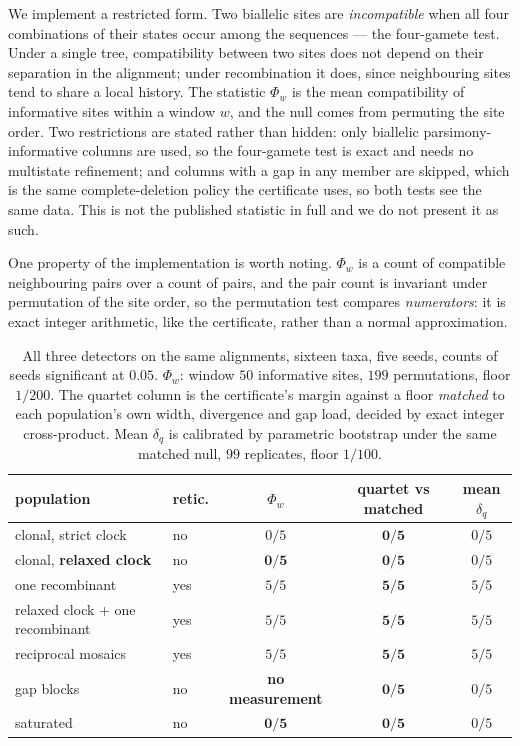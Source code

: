 \documentclass[11pt,a4paper]{article}
\theoremstyle{definition}
\theoremstyle{remark}
\begin{document}
We implement a restricted form. Two biallelic sites are \emph{incompatible} when
all four combinations of their states occur among the sequences --- the
four-gamete test. Under a single tree, compatibility between two sites does not
depend on their separation in the alignment; under recombination it does, since
neighbouring sites tend to share a local history. The statistic $\Phi_w$ is the
mean compatibility of informative sites within a window $w$, and the null comes
from permuting the site order. Two restrictions are stated rather than hidden:
only biallelic parsimony-informative columns are used, so the four-gamete test is
exact and needs no multistate refinement; and columns with a gap in any member
are skipped, which is the same complete-deletion policy the certificate uses, so
both tests see the same data. This is not the published statistic in full and we
do not present it as such.

One property of the implementation is worth noting. $\Phi_w$ is a count of
compatible neighbouring pairs over a count of pairs, and the pair count is
invariant under permutation of the site order, so the permutation test compares
\emph{numerators}: it is exact integer arithmetic, like the certificate, rather
than a normal approximation.

\begin{table}[h]
\centering\small
\caption{All three detectors on the same alignments, sixteen taxa, five seeds,
counts of seeds significant at $0.05$. $\Phi_w$: window $50$ informative sites,
$199$ permutations, floor $1/200$. The quartet column is the certificate's margin
against a floor \emph{matched} to each population's own width, divergence and gap
load, decided by exact integer cross-product. Mean $\delta_q$ is calibrated by
parametric bootstrap under the same matched null, $99$ replicates, floor
$1/100$.}
\label{tab:headtohead}
\begin{tabular}{@{}llccc@{}}
\toprule
population & retic. & $\Phi_w$ & quartet vs matched & mean $\delta_q$ \\
\midrule
clonal, strict clock            & no  & $0/5$ & $\mathbf{0/5}$ & $0/5$ \\
clonal, \textbf{relaxed clock}  & no  & $\mathbf{0/5}$ & $\mathbf{0/5}$ & $0/5$ \\
one recombinant                 & yes & $5/5$ & $\mathbf{5/5}$ & $5/5$ \\
relaxed clock + one recombinant & yes & $5/5$ & $\mathbf{5/5}$ & $5/5$ \\
reciprocal mosaics              & yes & $5/5$ & $\mathbf{5/5}$ & $5/5$ \\
gap blocks                      & no  & \textbf{no measurement} & $\mathbf{0/5}$ & $0/5$ \\
saturated                       & no  & $\mathbf{0/5}$ & $\mathbf{0/5}$ & $0/5$ \\
\bottomrule
\end{tabular}
\end{table}
\end{document}
